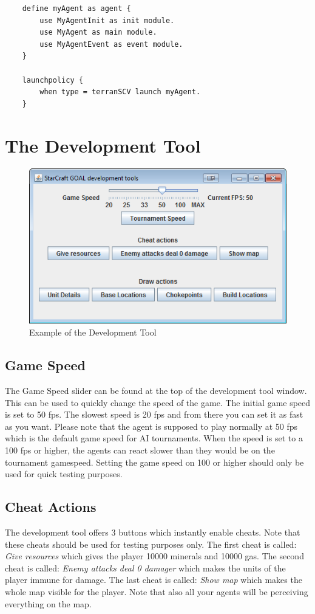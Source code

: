 \begin{verbatim}
    define myAgent as agent {  
        use MyAgentInit as init module.
        use MyAgent as main module.
        use MyAgentEvent as event module.
    }
    
    launchpolicy {
        when type = terranSCV launch myAgent.
    }
\end{verbatim}


\newpage
\section{The Development Tool}
\label{development tool}

\begin{figure}[h]
\includegraphics[width=1.0\textwidth]{images/developmentTool}
\caption{Example of the Development Tool}
\label{fig:starcraft_picture}
\end{figure}

\subsection{Game Speed}
The Game Speed slider can be found at the top of the development tool window. This can be used to quickly change the speed of the game. The initial game speed is set to 50 fps. The slowest speed is 20 fps and from there you can set it as fast as you want. Please note that the agent is supposed to play normally at 50 fps which is the default game speed for AI tournaments. When the speed is set to a 100 fps or higher, the agents can react slower than they would be on the tournament gamespeed. Setting the game speed on 100 or higher should only be used for quick testing purposes.

\subsection{Cheat Actions}
The development tool offers 3 buttons which instantly enable cheats. Note that these cheats should be used for testing purposes only. The first cheat is called: \textit{Give resources} which gives the player 10000 minerals and 10000 gas. The second cheat is called: \textit{Enemy attacks deal 0 damager} which makes the units of the player immune for damage. The last cheat is called: \textit{Show map} which makes the whole map visible for the player. Note that also all your agents will be perceiving everything on the map. 

